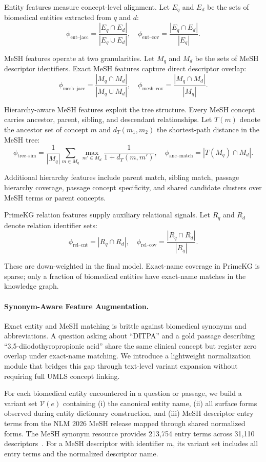 Entity features measure concept-level alignment. Let $E_q$ and $E_d$ be the sets of biomedical entities extracted from $q$ and $d$:
\[
  \phi_{\text{ent--jacc}} = \frac{|E_q \cap E_d|}{|E_q \cup E_d|}, \quad
  \phi_{\text{ent--cov}} = \frac{|E_q \cap E_d|}{|E_q|}.
\]

MeSH features operate at two granularities. Let $M_q$ and $M_d$ be the sets of MeSH descriptor identifiers. Exact MeSH features capture direct descriptor overlap:
\[
  \phi_{\text{mesh--jacc}} = \frac{|M_q \cap M_d|}{|M_q \cup M_d|}, \quad
  \phi_{\text{mesh--cov}} = \frac{|M_q \cap M_d|}{|M_q|}.
\]

Hierarchy-aware MeSH features exploit the tree structure. Every MeSH concept carries ancestor, parent, sibling, and descendant relationships. Let $T(m)$ denote the ancestor set of concept $m$ and $d_T(m_1, m_2)$ the shortest-path distance in the MeSH tree:
\[
  \phi_{\text{tree--sim}} = \frac{1}{|M_q|}\sum_{m \in M_q} \max_{m' \in M_d} \frac{1}{1 + d_T(m, m')}, \quad
  \phi_{\text{anc--match}} = |T(M_q) \cap M_d|.
\]

Additional hierarchy features include parent match, sibling match, passage hierarchy coverage, passage concept specificity, and shared candidate clusters over MeSH terms or parent concepts.

PrimeKG relation features supply auxiliary relational signals. Let $R_q$ and $R_d$ denote relation identifier sets:
\[
  \phi_{\text{rel--cnt}} = |R_q \cap R_d|, \quad
  \phi_{\text{rel--cov}} = \frac{|R_q \cap R_d|}{|R_q|}.
\]

These are down-weighted in the final model. Exact-name coverage in PrimeKG is sparse; only a fraction of biomedical entities have exact-name matches in the knowledge graph.

\paragraph{Synonym-Aware Feature Augmentation.}
Exact entity and MeSH matching is brittle against biomedical synonyms and abbreviations. A question asking about ``DITPA'' and a gold passage describing ``3,5-diiodothyropropionic acid'' share the same clinical concept but register zero overlap under exact-name matching. We introduce a lightweight normalization module that bridges this gap through text-level variant expansion without requiring full UMLS concept linking.

For each biomedical entity encountered in a question or passage, we build a variant set $\mathcal{V}(e)$ containing (i) the canonical entity name, (ii) all surface forms observed during entity dictionary construction, and (iii) MeSH descriptor entry terms from the NLM 2026 MeSH release mapped through shared normalized forms. The MeSH synonym resource provides 213,754 entry terms across 31,110 descriptors~\citep{nlm2026mesh}. For a MeSH descriptor with identifier $m$, its variant set includes all entry terms and the normalized descriptor name.

